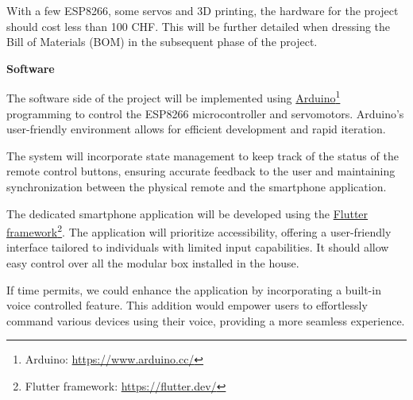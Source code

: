 \documentclass[12pt, a4paper, openany]{article}
\newcommand{\footlink}[2]{\href{#2}{#1}\footnote{{\MakeUppercase #1}: \url{#2}}}
\begin{document}
With a few ESP8266, some servos and 3D printing, the hardware for the project should cost less than 100 CHF.
This will be further detailed when dressing the Bill of Materials (BOM) in the subsequent phase of the project.

\textbf{Software}

The software side of the project will be implemented using \footlink{Arduino}{https://www.arduino.cc/} programming to control the ESP8266 microcontroller and servomotors.
Arduino's user-friendly environment allows for efficient development and rapid iteration.

The system will incorporate state management to keep track of the status of the remote control buttons, ensuring accurate feedback to the user and maintaining synchronization between the physical remote and the smartphone application.

The dedicated smartphone application will be developed using the \footlink{Flutter framework}{https://flutter.dev/}.
The application will prioritize accessibility, offering a user-friendly interface tailored to individuals with limited input capabilities.
It should allow easy control over all the modular box installed in the house.

If time permits, we could enhance the application by incorporating a built-in voice controlled feature.
This addition would empower users to effortlessly command various devices using their voice, providing a more seamless experience.
\end{document}
